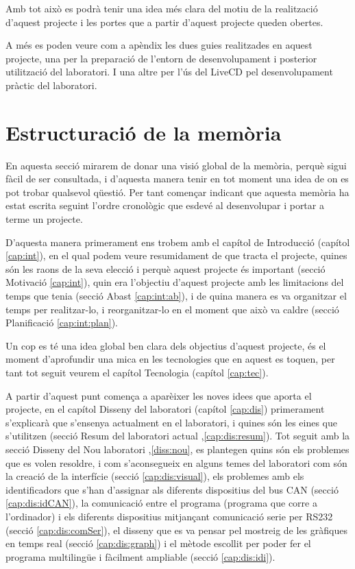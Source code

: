 Amb tot això es podrà tenir una idea més clara del motiu de la realització d'aquest projecte i les portes que a partir d'aquest projecte queden obertes.

A més es poden veure com a apèndix les dues guies realitzades en aquest projecte, una per la preparació de l'entorn de desenvolupament i posterior utilització del laboratori. I una altre per l'ús del LiveCD  pel desenvolupament pràctic del laboratori.

\section{Estructuració de la memòria}\label{cap:int:estruct}

En aquesta secció mirarem de donar una visió global de la memòria, perquè sigui fàcil de ser consultada, i d'aquesta manera tenir en tot moment una idea de on es pot trobar qualsevol qüestió. Per tant començar indicant que aquesta memòria ha estat escrita seguint l'ordre cronològic que esdevé al desenvolupar i portar a terme un projecte.

D'aquesta manera primerament ens trobem  amb el capítol de Introducció (capítol \ref{cap:int}), en el qual podem veure resumidament de que tracta el projecte, quines són les raons de la seva elecció i perquè aquest projecte és important (secció Motivació \ref{cap:int}), quin era l'objectiu d'aquest projecte amb les limitacions del temps que tenia (secció Abast \ref{cap:int:ab}), i de quina manera es va organitzar el temps per realitzar-lo, i reorganitzar-lo en el moment que això va caldre (secció Planificació \ref{cap:int:plan}).

Un cop es té una idea global ben clara dels objectius d'aquest projecte, és el moment d'aprofundir una mica en les tecnologies que en aquest es toquen, per tant tot seguit veurem el capítol Tecnologia (capítol \ref{cap:tec}).

A partir d'aquest punt comença a aparèixer les noves idees que aporta el projecte, en el capítol Disseny del laboratori (capítol \ref{cap:dis}) primerament s'explicarà que s'ensenya actualment en el laboratori, i quines són les eines que s'utilitzen (secció Resum del laboratori actual ,\ref{cap:dis:resum}). Tot seguit amb la secció Disseny del Nou laboratori ,\ref{diss:nou}, es plantegen quins són els problemes que es volen resoldre, i com s'aconsegueix en alguns temes del laboratori com són la creació de la interfície (secció \ref{cap:dis:visual}), els problemes amb els identificadors que s'han d'assignar als diferents dispositius del bus CAN (secció \ref{cap:dis:idCAN}), la comunicació entre el programa \DCSMonitor (programa que corre a l'ordinador) i els diferents dispositius mitjançant comunicació serie per RS232 (secció \ref{cap:dis:comSer}), el disseny que es va pensar pel mostreig de les gràfiques en temps real (secció \ref{cap:dis:graph}) i el mètode escollit per poder fer el programa multilingüe i fàcilment ampliable (secció \ref{cap:dis:idi}).

